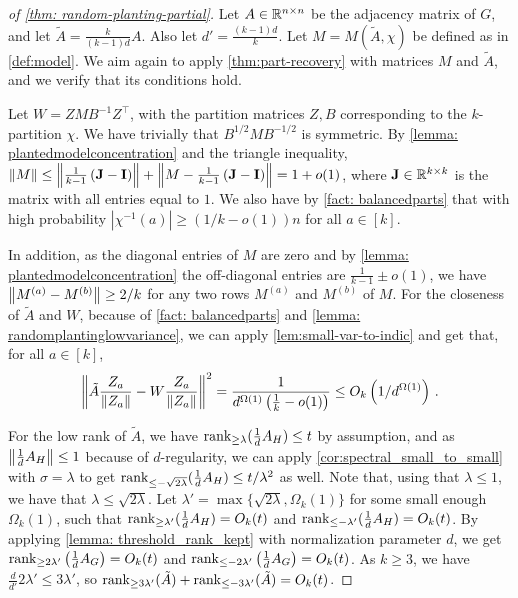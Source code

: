 \begin{proof}[of \cref{thm: random-planting-partial}]
    Let $A \in {\mathbb R}^{n \times n}$ be the adjacency matrix of $G$, and let $\tilde{A} = \frac{k}{(k-1)d} A$.
    Also let $d' = \frac{(k-1)d}{k}$.
    Let $M = M(\tilde{A}, \chi)$ be defined as in \cref{def:model}.
    We aim again to apply \cref{thm:part-recovery} with matrices $M$ and $\tilde{A}$, and we verify that its conditions hold.
    
    Let $W = Z M B^{-1} Z^\top$, with the partition matrices $Z, B$ corresponding to the $k$-partition $\chi$.
    We have trivially that $B^{1/2} M B^{-1/2}$ is symmetric.
    By \cref{lemma: plantedmodelconcentration} and the triangle inequality, $\left\lVert M\right\rVert\leq \left\lVert\frac1{k-1}\left(\mathbf{J}-\mathbf{I}\right)\right\rVert+\left\lVert M-\frac1{k-1}\left(\mathbf{J}-\mathbf{I}\right)\right\rVert=1+o(1)$, where $\mathbf{J} \in {\mathbb R}^{k \times k}$ is the matrix with all entries equal to $1$.
    We also have by \cref{fact: balancedparts} that with high probability $|\chi^{-1}(a)| \geq (1/k-o(1))n$ for all $a \in [k]$.
    
    In addition, as the diagonal entries of $M$ are zero and by \cref{lemma: plantedmodelconcentration} the off-diagonal entries are $\frac1{k-1}\pm o(1)$, we have $\left\lVert M^{(a)} - M^{(b)}\right\rVert \geq 2/k$ for any two rows $M^{(a)}$ and $M^{(b)}$ of $M$.
    For the closeness of $\tilde{A}$ and $W$, because of  \cref{fact: balancedparts} and \cref{lemma: randomplantinglowvariance}, we can apply \cref{lem:small-var-to-indic} and get that, for all $a\in [k]$,
    \[\left\lVert\tilde{A} \frac{Z_a}{\left\lVert Z_a\right\rVert} - W  \frac{Z_a}{\left\lVert Z_a\right\rVert}\right\rVert^2 = \frac{1}{d^{\Omega(1)} \left(\frac{1}{k}-o(1)\right)} \leq O_k\left(1/d^{\Omega(1)}\right)\,.\]

    For the low rank of $\tilde{A}$, we have $\operatorname{rank}_{\geq \lambda}(\frac{1}{d}A_H) \leq t$ by assumption, and as $\left\lVert\frac1{d}A_H\right\rVert\leq 1$ because of $d$-regularity, we can apply \cref{cor:spectral_small_to_small} with $\sigma=\lambda$ to get $\operatorname{rank}_{\leq -\sqrt{2\lambda}}(\frac{1}{d}A_H) \leq t/\lambda^2$ as well. 
    Note that, using that $\lambda \leq 1$, we have that $\lambda \leq \sqrt{2 \lambda}$.
    Let $\lambda' = \max\{\sqrt{2\lambda}, \Omega_k(1)\}$ for some small enough $\Omega_k(1)$, such that $\operatorname{rank}_{\geq \lambda'}(\frac{1}{d}A_H)=O_k(t)$ and $\operatorname{rank}_{\leq -\lambda'}(\frac{1}{d}A_H)=O_k(t)$.
    By applying \cref{lemma: threshold_rank_kept} with normalization parameter $d$, we get $\operatorname{rank}_{\geq 2\lambda'}\left(\frac1{d}A_G\right)=O_k(t)$ and $\operatorname{rank}_{\leq -2\lambda'}\left(\frac1{d}A_G\right)=O_k(t)$.
    As $k\geq 3$, we have $\frac{d}{d'}2\lambda'\leq 3\lambda'$, so $\operatorname{rank}_{\geq 3\lambda'}(\tilde{A})+\operatorname{rank}_{\leq -3\lambda'}(\tilde{A})=O_k(t)$.


\end{proof}
